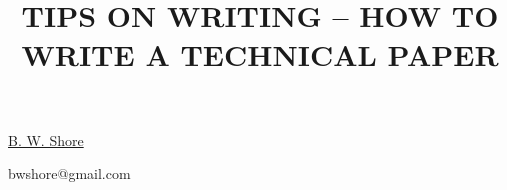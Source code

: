 \title{TIPS ON WRITING -- HOW TO WRITE A TECHNICAL PAPER}

\underline{B. W. Shore}  


\email bwshore@gmail.com


\vspace{\baselineskip}